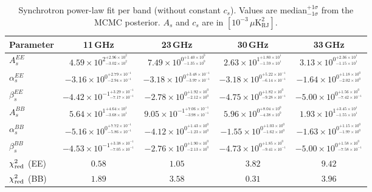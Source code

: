 \begin{table}[htbp]
\centering
\caption{Synchrotron power-law fit per band (without constant $c_s$). Values are median$^{+1\sigma}_{-1\sigma}$ from the MCMC posterior. $A_s$ and $c_s$ are in $[10^{-3}\,\mu\mathrm{K}^2_\mathrm{RJ}]$.}
\label{tab:sync_single_band_noc}
\begin{tabular}{lcccc}
\toprule
Parameter & 11\,GHz & 23\,GHz & 30\,GHz & 33\,GHz \\
\midrule
$A_s^{EE}$ & $4.59\times10^{2}^{+2.96\times10^{2}}_{-3.02\times10^{2}}$ & $7.49\times10^{0}^{+1.40\times10^{0}}_{-1.35\times10^{0}}$ & $2.63\times10^{1}^{+1.80\times10^{1}}_{-1.59\times10^{1}}$ & $3.13\times10^{0}^{+2.36\times10^{1}}_{-1.15\times10^{1}}$ \\
$\alpha_s^{EE}$ & $-3.16\times10^{0}^{+2.79\times10^{-1}}_{-2.94\times10^{-1}}$ & $-3.18\times10^{0}^{+3.48\times10^{-1}}_{-3.97\times10^{-1}}$ & $-3.18\times10^{0}^{+5.22\times10^{-1}}_{-6.14\times10^{-1}}$ & $-1.64\times10^{0}^{+1.18\times10^{0}}_{-2.02\times10^{0}}$ \\
$\beta_s^{EE}$ & $-4.42\times10^{-1}^{+3.29\times10^{-1}}_{-7.17\times10^{-1}}$ & $-2.78\times10^{0}^{+1.92\times10^{0}}_{-2.12\times10^{0}}$ & $-4.75\times10^{0}^{+1.82\times10^{0}}_{-9.28\times10^{-1}}$ & $-5.00\times10^{0}^{+1.56\times10^{0}}_{-7.42\times10^{-1}}$ \\
\midrule
$A_s^{BB}$ & $5.64\times10^{1}^{+4.64\times10^{1}}_{-3.68\times10^{1}}$ & $9.05\times10^{-1}^{+7.06\times10^{-1}}_{-3.98\times10^{-1}}$ & $5.96\times10^{0}^{+8.04\times10^{0}}_{-4.38\times10^{0}}$ & $1.93\times10^{1}^{+3.45\times10^{1}}_{-1.55\times10^{1}}$ \\
$\alpha_s^{BB}$ & $-5.16\times10^{0}^{+7.72\times10^{-1}}_{-5.86\times10^{-1}}$ & $-4.12\times10^{0}^{+1.43\times10^{0}}_{-1.23\times10^{0}}$ & $-1.55\times10^{0}^{+1.03\times10^{0}}_{-1.62\times10^{0}}$ & $-1.63\times10^{0}^{+1.15\times10^{0}}_{-1.97\times10^{0}}$ \\
$\beta_s^{BB}$ & $-4.53\times10^{-1}^{+3.38\times10^{-1}}_{-7.05\times10^{-1}}$ & $-2.76\times10^{0}^{+1.90\times10^{0}}_{-2.13\times10^{0}}$ & $-4.73\times10^{0}^{+1.85\times10^{0}}_{-9.41\times10^{-1}}$ & $-5.00\times10^{0}^{+1.58\times10^{0}}_{-7.58\times10^{-1}}$ \\
\midrule
$\chi^2_{\rm red}$ (EE) & $0.58$ & $1.05$ & $3.82$ & $9.42$ \\
$\chi^2_{\rm red}$ (BB) & $1.89$ & $3.58$ & $0.31$ & $3.96$ \\
\bottomrule
\end{tabular}
\end{table}
